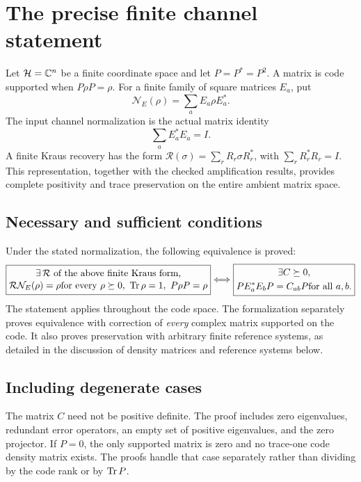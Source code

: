 \section{The precise finite channel statement}\label{supp5:section:001}
Let $\mathcal H=\C^n$ be a finite coordinate space and let $P=P^*=P^2$. A matrix is code supported when $P\rho P=\rho$. For a finite family of square matrices $E_a$, put
\[
\mathcal N_E(\rho)=\sum_a E_a\rho E_a^*.
\]
The input channel normalization is the actual matrix identity
\[
\sum_a E_a^*E_a=I.
\]
A finite Kraus recovery has the form $\mathcal R(\sigma)=\sum_r R_r\sigma R_r^*$, with $\sum_rR_r^*R_r=I$. This representation, together with the checked amplification results, provides complete positivity and trace preservation on the entire ambient matrix space.

\subsection{Necessary and sufficient conditions}
Under the stated normalization, the following equivalence is proved:
\[
\boxed{\begin{gathered}
\exists\,\mathcal R\text{ of the above finite Kraus form,}\\[-2pt]
\mathcal R\mathcal N_E(\rho)=\rho
\quad\text{for every }\rho\succeq0,\ \Tr\rho=1,\ P\rho P=\rho
\end{gathered}}
\quad\Longleftrightarrow\quad
\boxed{\begin{gathered}
\exists C\succeq0,\\
PE_a^*E_bP=C_{ab}P\quad\text{for all }a,b.
\end{gathered}}
\]
The statement applies throughout the code space. The formalization separately proves equivalence with correction of \emph{every} complex matrix supported on the code. It also proves preservation with arbitrary finite reference systems, as detailed in the discussion of density matrices and reference systems below.



\subsection{Including degenerate cases}
The matrix $C$ need not be positive definite. The proof includes zero eigenvalues, redundant error operators, an empty set of positive eigenvalues, and the zero projector. If $P=0$, the only supported matrix is zero and no trace-one code density matrix exists. The proofs handle that case separately rather than dividing by the code rank or by $\operatorname{Tr} P$.

